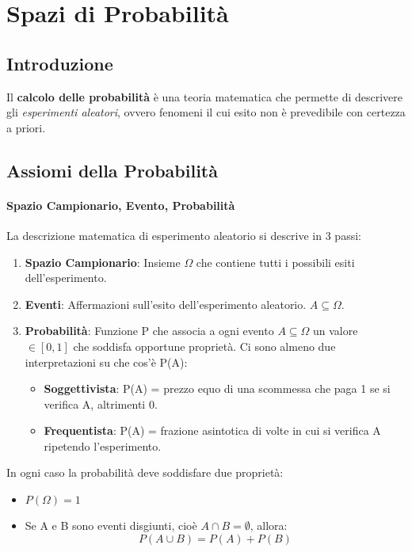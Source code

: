 \renewcommand{\labelitemi}{\textsc{\labelitemiv}}

\chapter[Spazi di Probabilità]{Spazi di Probabilità}

\section{Introduzione}

Il \textbf{calcolo delle probabilità} è una teoria matematica che permette di descrivere gli \textit{esperimenti aleatori}, ovvero fenomeni il cui esito non è prevedibile con certezza a priori.

\section{Assiomi della Probabilità}

\subsubsection{Spazio Campionario, Evento, Probabilità}

La descrizione matematica di esperimento aleatorio si descrive in 3 passi:
\begin{enumerate}
    \item \textbf{Spazio Campionario}: Insieme $\Omega$ che contiene tutti i possibili esiti dell'esperimento. 
    \item \textbf{Eventi}: Affermazioni sull'esito dell'esperimento aleatorio. $A \subseteq \Omega$. 
    \item \textbf{Probabilità}: Funzione P che associa a ogni evento $A \subseteq \Omega$ un valore $\in [0, 1]$ che soddisfa opportune proprietà. Ci sono almeno due interpretazioni su che cos'è P(A):
        \begin{itemize}
            \item \textbf{Soggettivista}: P(A) = prezzo equo di una scommessa che paga 1 se si verifica A, altrimenti 0.
            \item \textbf{Frequentista}: P(A) = frazione asintotica di volte in cui si verifica A ripetendo l'esperimento.
        \end{itemize}
\end{enumerate}
\newpage
\noindent In ogni caso la probabilità deve soddisfare due proprietà:
    \begin{itemize}
        \item $P(\Omega)=1$
        \item Se A e B sono eventi disgiunti, cioè $ A \cap B = \emptyset $, allora: $$P(A \cup B) = P(A) + P(B) $$
    \end{itemize}


